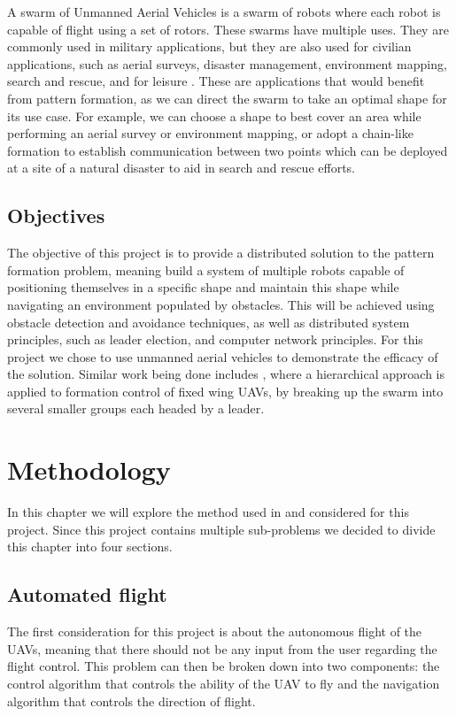 A swarm of Unmanned Aerial Vehicles is a swarm of robots where each robot is capable of flight using
a set of rotors. These swarms have multiple uses. They are commonly used in military applications, but
they are also used for civilian applications, such as aerial surveys, disaster management, environment
mapping, search and rescue, and for leisure \autocite{TA19}. These are applications that would benefit
from pattern formation, as we can direct the swarm to take an optimal shape for its use case. For 
example, we can choose a shape to best cover an area while performing an aerial survey or environment
mapping, or adopt a chain-like formation to establish communication between two points \autocite{MS20}
which can be deployed at a site of a natural disaster to aid in search and rescue efforts.


\section{Objectives}

The objective of this project is to provide a distributed solution to the pattern formation problem, meaning
build a system of multiple robots capable of positioning themselves in a specific shape and maintain this
shape while navigating an environment populated by obstacles. This will be achieved using obstacle detection
and avoidance techniques, as well as distributed system principles, such as leader election, and computer
network principles. For this project we chose to use unmanned aerial vehicles to demonstrate the efficacy
of the solution. Similar work being done includes \autocite{HC21}, where a hierarchical approach is applied
to formation control of fixed wing UAVs, by breaking up the swarm into several smaller groups each headed by a 
leader.


\chapter{Methodology}

In this chapter we will explore the method used in and considered for this project. Since this project
contains multiple sub-problems we decided to divide this chapter into four sections.

\section{Automated flight}

The first consideration for this project is about the autonomous flight of the UAVs, meaning that there 
should not be any input from the user regarding the flight control. This problem can then be broken down
into two components: the control algorithm that controls the ability of the UAV to fly and the navigation
algorithm that controls the direction of flight.

